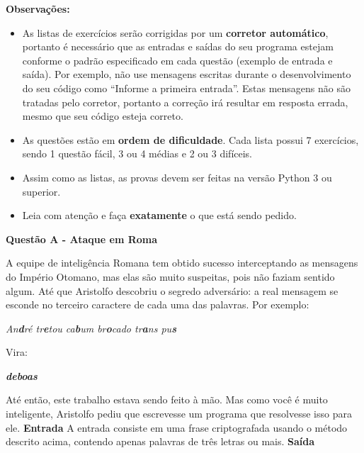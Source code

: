 \documentclass[a4paper, 12pt]{article}
\begin{document}
\textbf{{\large Observações:}}
\begin{itemize}
	\item As listas de exercícios serão corrigidas por um \textbf{corretor automático}, portanto é necessário que as entradas e saídas do seu programa estejam conforme o padrão especificado em cada questão (exemplo de entrada e saída). Por exemplo, não use mensagens escritas durante o desenvolvimento do seu código como ``Informe a primeira entrada''. Estas mensagens não são tratadas pelo corretor, portanto a correção irá resultar em resposta errada, mesmo que seu código esteja correto.
	\item As questões estão em \textbf{ordem de dificuldade}. Cada lista possui 7 exercícios, sendo 1 questão fácil, 3 ou 4 médias e 2 ou 3 difíceis.
	\item Assim como as listas, as provas devem ser feitas na versão Python 3 ou superior.
	\item Leia com atenção e faça \textbf{exatamente} o que está sendo pedido.
\end{itemize}
\newpage %
\begin{center}
\textbf{{\Large Questão A - Ataque em Roma}}
\end{center}
\vspace{5pt}
A equipe de inteligência Romana tem obtido sucesso interceptando as mensagens do Império Otomano, mas elas são muito suspeitas, pois não faziam sentido algum. Até que Aristolfo descobriu o segredo adversário: a real mensagem se esconde no terceiro caractere de cada uma das palavras. Por exemplo:
\begin{center} \textit{An\textbf{d}ré tr\textbf{e}tou ca\textbf{b}um br\textbf{o}cado tr\textbf{a}ns pu\textbf{s}}\end{center}
Vira:
\begin{center} \textit{\textbf{deboas}}\end{center}
Até então, este trabalho estava sendo feito à mão. Mas como você é muito
inteligente, Aristolfo pediu que escrevesse um programa que resolvesse isso
para ele.
\newline \newline
\textbf{{\large Entrada}} \newline
A entrada consiste em uma frase criptografada usando o método descrito acima, contendo apenas palavras de três letras ou mais.
\newline \newline
\textbf{{\large Saída}} \newline
\end{document}

